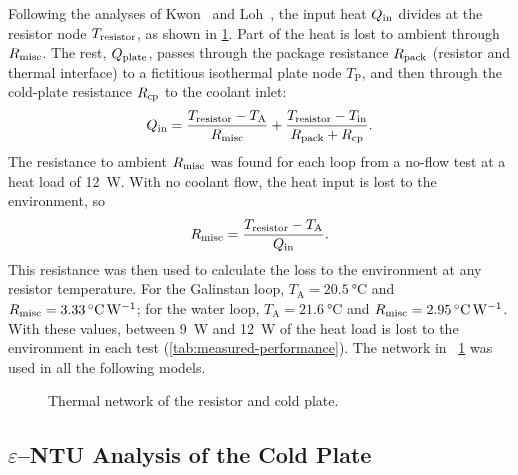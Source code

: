 Following the analyses of Kwon~\cite{kwon_project_2025} and
Loh~\cite{loh_project_2025}, the input heat $Q_{\mathrm{in}}$ divides at the resistor node
$T_{\mathrm{resistor}}$, as shown in \cref{fig:thermal-network}. Part of the heat is
lost to ambient through $R_{\mathrm{misc}}$. The rest, $Q_{\mathrm{plate}}$, passes through the
package resistance $R_{\mathrm{pack}}$ (resistor and thermal interface) to a fictitious
isothermal plate node $T_{\mathrm{P}}$, and then through the cold-plate
resistance $R_{\mathrm{cp}}$ to the coolant inlet:
\begin{equation}
  Q_{\mathrm{in}} = \frac{T_{\mathrm{resistor}} - T_{\mathrm{A}}}{R_{\mathrm{misc}}}
       + \frac{T_{\mathrm{resistor}} - T_{\mathrm{in}}}{R_{\mathrm{pack}} + R_{\mathrm{cp}}}.
  \label{eq:network}
\end{equation}
The resistance to ambient $R_{\mathrm{misc}}$ was found for each loop from a no-flow test
at a heat load of \SI{12}{\watt}. With no coolant flow, the heat input is lost
to the environment, so
\begin{equation}
  R_{\mathrm{misc}} = \frac{T_{\mathrm{resistor}} - T_{\mathrm{A}}}{Q_{\mathrm{in}}}.
  \label{eq:rmisc}
\end{equation}
This resistance was then used to calculate the loss to the environment at any
resistor temperature. For the Galinstan loop, $T_{\mathrm{A}} =
\SI{20.5}{\celsius}$ and $R_{\mathrm{misc}} = \SI{3.33}{\celsius\per\watt}$; for the water
loop, $T_{\mathrm{A}} = \SI{21.6}{\celsius}$ and
$R_{\mathrm{misc}} = \SI{2.95}{\celsius\per\watt}$. With these values, between
\SI{9}{\watt} and \SI{12}{\watt} of the heat load is lost to the environment in
each test (\cref{tab:measured-performance}). The network in ~\cref{fig:thermal-network} was used in all the
following models.

\begin{figure}[htbp]
  \centering
  
  \caption{Thermal network of the resistor and cold plate.}
  \label{fig:thermal-network}
\end{figure}

\subsection{\texorpdfstring{$\varepsilon$--NTU}{epsilon-NTU} Analysis of the Cold Plate}
\label{sec:eps-ntu}

